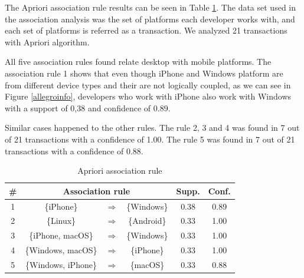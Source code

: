 \documentclass[10pt, conference]{IEEEtran}
\begin{document}

The Apriori association rule results can be seen in Table \ref{assocrule}. The data set used in the association analysis was the set of platforms each developer works with, and each set of platforms is referred as a transaction. We analyzed 21 transactions with Apriori algorithm. 

All five association rules found relate desktop with mobile platforms. The association rule 1 shows that even though iPhone and Windows platform are from different device types and their are not logically coupled, as we can see in Figure \ref{allegroinfo}, developers who work with iPhone also work with Windows with a support of 0,38 and confidence of 0.89. 

Similar cases happened to the other rules. The rule 2, 3 and 4 was found in 7 out of 21  transactions with a confidence of 1.00.  The rule 5 was found in 7 out of 21 transactions with a confidence of 0.88. 






\begin{table}[h]
\renewcommand{\arraystretch}{1.3}
\caption{Apriori association rule}
\label{assocrule}
\centering
\begin{tabular}{|c|c c c|c|c|}
\hline
 \# & \multicolumn{3}{|c|}{Association rule} & Supp. & Conf. \\
\hline
1&  \{iPhone\}      &$\Rightarrow$  &   \{Windows\} &   0.38  &   0.89  \\
\hline
2&  \{Linux\}       & $\Rightarrow$ &   \{Android\} &   0.33  &   1.00  \\
\hline
3&  \{iPhone, macOS\} &$\Rightarrow$  &   \{Windows\} &   0.33  &   1.00  \\
\hline
4&  \{Windows, macOS\} &$\Rightarrow$&    \{iPhone\}  &   0.33  &   1.00  \\
\hline
5&  \{Windows, iPhone\} &$\Rightarrow$&    \{macOS\}  &   0.33  &   0.88  \\
\hline
\end{tabular}
\end{table} 
\end{document}
